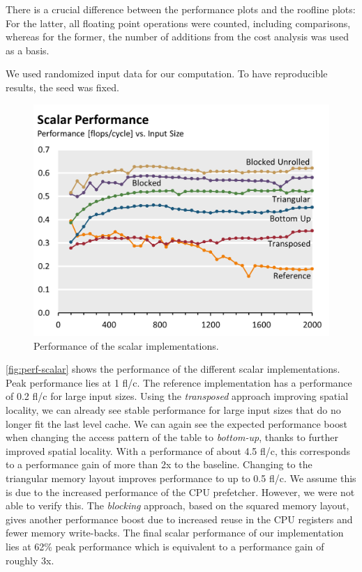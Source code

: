 There is a crucial difference between the performance plots and the roofline
plots: For the latter, all floating point operations were counted, including
comparisons, whereas for the former, the number of additions from the cost
analysis was used as a basis.

We used randomized input data for our computation. To have reproducible
results, the seed was fixed.

\begin{figure}[htb]\centering
  \includegraphics[width=\linewidth]{plot_data/scalar_performance.png}
  \caption{Performance of the scalar implementations.}
  \label{fig:perf-scalar}
\end{figure}
\autoref{fig:perf-scalar} shows the performance of the different scalar
implementations. Peak performance lies at 1 fl/c. The reference
implementation has a performance of 0.2 fl/c for large input sizes. Using
the \emph{transposed} approach improving spatial locality, we can already
see stable performance for large input sizes that do no longer fit the last
level cache. We can again see the expected performance boost when changing
the access pattern of the table to \emph{bottom-up}, thanks to further
improved spatial locality. With a performance of about 4.5 fl/c, this
corresponds to a performance gain of more than 2x to the baseline. Changing
to the triangular memory layout improves performance to up to 0.5 fl/c. We
assume this is due to the increased performance of the CPU prefetcher.
However, we were not able to verify this. The \emph{blocking} approach,
based on the squared memory layout, gives another performance boost due to
increased reuse in the CPU registers and fewer memory write-backs. The
final scalar performance of our implementation lies at 62\% peak
performance which is equivalent to a performance gain of roughly 3x.

